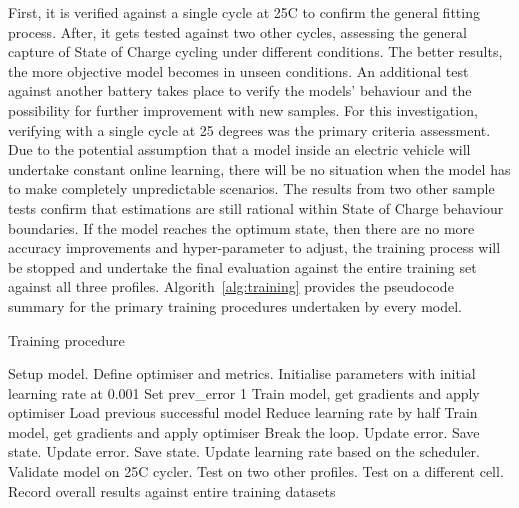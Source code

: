 %
First, it is verified against a single cycle at 25\textdegree{}C to confirm the general fitting process.
After, it gets tested against two other cycles, assessing the general capture of State of Charge cycling under different conditions.
The better results, the more objective model becomes in unseen conditions.
An additional test against another battery takes place to verify the models' behaviour and the possibility for further improvement with new samples.
For this investigation, verifying with a single cycle at 25 degrees was the primary criteria assessment.
Due to the potential assumption that a model inside an electric vehicle will undertake constant online learning, there will be no situation when the model has to make completely unpredictable scenarios.
The results from two other sample tests confirm that estimations are still rational within State of Charge behaviour boundaries.
If the model reaches the optimum state, then there are no more accuracy improvements and hyper-parameter to adjust, the training process will be stopped and undertake the final evaluation against the entire training set against all three profiles.
Algorith~\ref{alg:training} provides the pseudocode summary for the primary training procedures undertaken by every model.
\begin{algorithm}
    \caption{Training procedure}
        \begin{algorithmic}[1]
            \STATE Setup model. Define optimiser and metrics.
            \STATE Initialise parameters with initial learning rate at 0.001
            \STATE Set prev\_error 1
                \STATE Train model, get gradients and apply optimiser
                        \STATE Load previous successful model
                        \STATE Reduce learning rate by half
                        \STATE Train model, get gradients and apply optimiser
                            \STATE Break the loop. Update error. Save state.
                        \ENDIF
                    \ENDWHILE
                \ELSE
                    \STATE Update error. Save state.
                    \STATE Update learning rate based on the scheduler.
                \ENDIF
                \STATE Validate model on 25\textdegree{}C cycler.
                \STATE Test on two other profiles.
                \STATE Test on a different cell.
            \ENDWHILE
            \STATE Record overall results against entire training datasets
        \end{algorithmic}
    \label{alg:training}
\end{algorithm}

